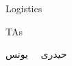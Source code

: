 \documentclass[handout]{beamer}
\begin{document}
\begin{frame}{Logistics}

\end{frame}


\begin{frame}{TAs}
\begin{center}
	
{\FAN\LARGE حیدری \ \ یونس}\qquad\qquad\qquad\qquad\qquad{}
\end{center}\bigskip	

\end{frame}
\end{document}
